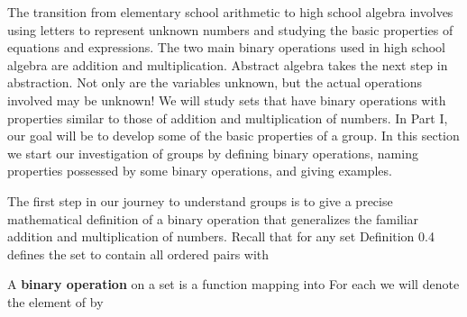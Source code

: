 \documentclass[11pt,oneside]{article}
\begin{document}
\fi
\renewcommand{\BookFooter}{Section 1 Binary Operations}
\ifdefined\BookMaster\else\setcounter{page}{11}\fi

\BookNarrativetrue

\begin{BookBody}


\noindent The transition from elementary school arithmetic to high school algebra involves using letters to represent unknown numbers and studying the basic properties of equations and expressions. The two main binary operations used in high school algebra are addition and multiplication. Abstract algebra takes the next step in abstraction. Not only are the variables unknown, but the actual operations involved may be unknown! We will study sets that have binary operations with properties similar to those of addition and multiplication of numbers. In Part I, our goal will be to develop some of the basic properties of a group. In this section we start our investigation of groups by defining binary operations, naming properties possessed by some binary operations, and giving examples.


\noindent The first step in our journey to understand groups is to give a precise mathematical definition of a binary operation that generalizes the familiar addition and multiplication of numbers. Recall that for any set  Definition 0.4 defines the set  to contain all ordered pairs  with 

 A\textbf{ binary operation} \BookInline{\ast } on a set  is a function mapping  into  For each   we will denote the element  of  by \BookEnd{\blacksquare}


\end{BookBody}
\end{document}
